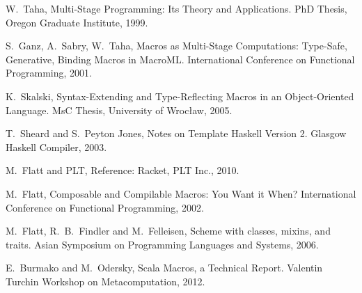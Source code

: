 \documentclass[10pt,journal,a4paper]{IEEEtran}
\begin{document}
\begin{thebibliography}{99}
W.~Taha,
Multi-Stage Programming: Its Theory and Applications.
PhD Thesis, Oregon Graduate Institute, 1999.

S.~Ganz, A.~Sabry, W.~Taha,
Macros as Multi-Stage Computations: Type-Safe, Generative, Binding Macros in MacroML.
International Conference on Functional Programming, 2001.


K.~Skalski,
Syntax-Extending and Type-Reflecting Macros in an Object-Oriented Language.
MsC Thesis, University of Wroc{\l}aw, 2005.

T.~Sheard and S.~Peyton Jones,
Notes on Template Haskell Version 2.
Glasgow Haskell Compiler, 2003.

M.~Flatt and PLT,
Reference: Racket,
PLT Inc., 2010.

M.~Flatt,
Composable and Compilable Macros: You Want it When?
International Conference on Functional Programming, 2002.


M.~Flatt, R.~B.~Findler and M.~Felleisen,
Scheme with classes, mixins, and traits.
Asian Symposium on Programming Languages and Systems, 2006.


E.~Burmako and M.~Odersky,
Scala Macros, a Technical Report.
Valentin Turchin Workshop on Metacomputation, 2012.

\end{thebibliography}
\end{document}
